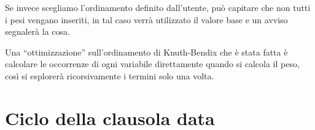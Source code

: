 \documentclass[a4paper,11pt]{article} %
\newcommand{\classe}{\textsf}
\begin{document}
Se invece scegliamo l'ordinamento definito dall'utente, 
può capitare che non tutti i pesi vengano inseriti, 
in tal caso verrà utilizzato il valore base
e un avviso
segnalerà la cosa.

Una ``ottimizzazione'' sull'ordinamento di Knuth-Bendix che è stata fatta è
calcolare le occorrenze di ogni variabile direttamente quando si calcola il peso,
così si esplorerà ricorsivamente i termini solo una volta.

\section{Ciclo della clausola data}\label{sec: ciclo}
\end{document}
